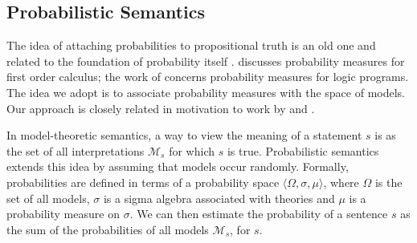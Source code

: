\documentclass[a4paper,11pt]{article}
\renewcommand{\cite}{\citep}
\newcommand{\newcite}[1]{\citet{#1}}
\theoremstyle{definition}
\begin{document}
\subsection{Probabilistic Semantics}
 
The idea of attaching probabilities to propositional truth is an old one and related to the foundation of probability itself
\cite{Keynes:21,Los:55}. \newcite{Gaifman:64} discusses probability measures for first order calculus; the work of \newcite{Sato:95}
concerns probability measures for logic programs. The idea we adopt is to associate probability measures with the space of models.
Our approach is closely related in motivation to work by \newcite{Cooper:14}
and \newcite{Goodman:14}.





In model-theoretic semantics, a way to
view the meaning of a statement $s$ is as the set of all
interpretations $\mathcal{M}_s$ for which $s$ is true. 
Probabilistic semantics extends this idea by assuming
that models occur randomly.
Formally, probabilities are defined in
terms of a probability space $\langle \Omega, \sigma, \mu\rangle$,
where $\Omega$ is the set of all models, $\sigma$ is a sigma algebra
associated with theories and $\mu$ is a probability measure on
$\sigma$.
We can then estimate the probability of a sentence $s$ as
the sum of the probabilities of all models $\mathcal{M}_s$, for $s$.
\end{document}

